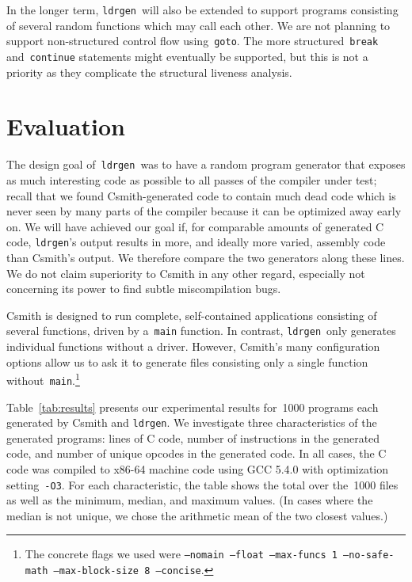 \documentclass{llncs}
\newcommand\ldrgen{\texttt{ldrgen}}
\begin{document}
In the longer term, \ldrgen\ will also be extended to support programs
consisting of several random functions which may call each other. We are not
planning to support non-structured control flow using~\verb|goto|. The more
structured~\verb|break| and~\verb|continue| statements might eventually be
supported, but this is not a priority as they complicate the structural
liveness analysis.


\section{Evaluation}
\label{sec:evaluation}

The design goal of~\ldrgen\ was to have a random program generator that
exposes as much interesting code as possible to all passes of the compiler
under test; recall that we found Csmith-generated code to contain much dead
code which is never seen by many parts of the compiler because it can be
optimized away early on. We will have achieved our goal if, for comparable
amounts of generated C code, \ldrgen's output results in more, and ideally
more varied, assembly code than Csmith's output. We therefore compare the
two generators along these lines. We do not claim superiority to Csmith in
any other regard, especially not concerning its power to find subtle
miscompilation bugs.

Csmith is designed to run complete, self-contained applications consisting
of several functions, driven by a~\verb|main| function. In contrast,
\ldrgen\ only generates individual functions without a driver. However,
Csmith's many configuration options allow us to ask it to generate files
consisting only a single function without~\verb|main|.\footnote{The concrete
flags we used were \texttt{--nomain --float --max-funcs 1 --no-safe-math
--max-block-size 8 --concise}.}

Table~\ref{tab:results} presents our experimental results for~1000 programs
each generated by Csmith and \ldrgen. We investigate three characteristics
of the generated programs: lines of C code, number of instructions in the
generated code, and number of unique opcodes in the generated code. In all
cases, the C code was compiled to x86-64 machine code using GCC 5.4.0 with
optimization setting~\verb|-O3|. For each characteristic, the table shows
the total over the~1000 files as well as the minimum, median, and maximum
values. (In cases where the median is not unique, we chose the arithmetic
mean of the two closest values.)
\end{document}
